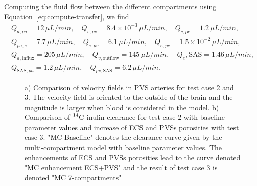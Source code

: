 \documentclass[10pt]{article}
\newcommand{\1}{^{(1)}}
\newcommand{\2}{^{(2)}}
\newcommand{\Cinulin}{$\prescript{14}{}{\text{C}}$-inulin }
\newcommand{\commentout}[1]{}
\begin{document}
Computing the fluid flow between the different compartments using Equation~\eqref{eq:compute-transfer}, we find 
\[
\begin{aligned}
    Q_{a,pa} = 12 \, \si{\mu L/min},\quad Q_{v,pv} = 8.4 \times 10^{-3} \, \si{\mu L/min},\quad Q_{c,pc} = 1.2 \, \si{\mu L/min}, \\
    Q_{pa,e} = 7.7 \, \si{\mu L/min},\quad Q_{e,pv} = 6.1  \,\si{\mu L/min},\quad Q_{e,pc} = 1.5 \times 10^{-2} \, \si{\mu L/min}, \\
    Q_{a,\text{influx}} = 205 \, \si{\mu L/min} , \quad Q_{v,\text{outflow}  } = 145 \, \si{\mu L/min},\quad Q_{e},\text{SAS} = 1.46 \, \si{\mu L/min},\\
    Q_{\text{SAS},pa} = 1.2 \,  \si{\mu L/min},\quad Q_{pv,\text{SAS}} = 6.2 \, \si{\mu L/min}.
\end{aligned}
\]

\commentout{
\begin{figure}[htbp]
         \centering
        \caption{Comparison of \Cinulin clearance for test case 2 with baseline parameter values and increse of ECS and PVSs porosities with test case 3. "MC Baseline" denotes the  clearance curve given by the multi-compartment model with baseline parameter values. The enhancements of ECS and PVSs porosities lead to the curve denoted "MC enhancement ECS+PVS" and the result of test case 3 is denoted "MC 7 compartements"}
        \label{fig:compare-blood}
\end{figure}
}

\begin{figure}
    \centering
    \caption{a) Comparison of velocity fields in PVS arteries for test case 2 and 3. The velocity field is oriented to the outside of the brain and the magnitude is larger when blood is considered in the model. b) Comparison of \Cinulin clearance for test case 2 with baseline parameter values and increase of ECS and PVSs porosities with test case 3. "MC Baseline" denotes the  clearance curve given by the multi-compartment model with baseline parameter values. The enhancements of ECS and PVSs porosities lead to the curve denoted "MC enhancement ECS+PVS" and the result of test case 3 is denoted "MC 7-compartments"}
    \label{fig:blood}
\end{figure}
\end{document}
